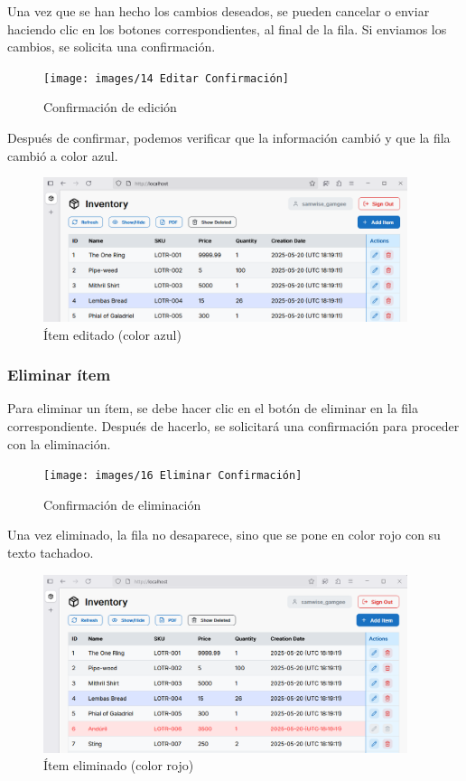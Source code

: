Una vez que se han hecho los cambios deseados, se pueden cancelar o enviar haciendo clic en los botones correspondientes, al final de la fila. Si enviamos los cambios, se solicita una confirmación.

\begin{figure}[H]
    \centering
    \texttt{[image: images/14 Editar Confirmación]}
    \caption{Confirmación de edición}
\end{figure}

Después de confirmar, podemos verificar que la información cambió y que la fila cambió a color azul.

\begin{figure}[H]
    \centering
    \includegraphics[width=0.95\textwidth]{images/15 Fila Editada}
    \caption{Ítem editado (color azul)}
\end{figure}

\subsubsection{Eliminar ítem}

Para eliminar un ítem, se debe hacer clic en el botón de eliminar en la fila correspondiente. Después de hacerlo, se solicitará una confirmación para proceder con la eliminación.

\begin{figure}[H]
    \centering
    \texttt{[image: images/16 Eliminar Confirmación]}
    \caption{Confirmación de eliminación}
\end{figure}

Una vez eliminado, la fila no desaparece, sino que se pone en color rojo con su texto tachadoo.

\begin{figure}[H]
    \centering
    \includegraphics[width=0.95\textwidth]{images/17 Fila Eliminada}
    \caption{Ítem eliminado (color rojo)}
\end{figure}


